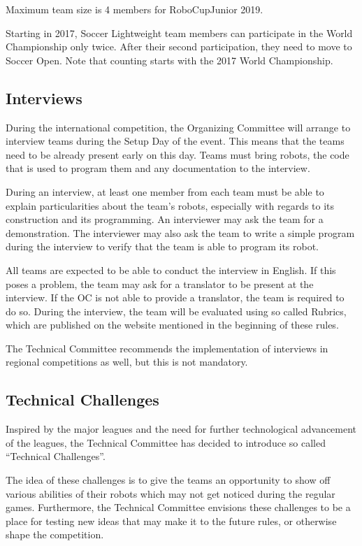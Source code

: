 \documentclass{article}
\begin{document}
Maximum team size is 4 members for RoboCupJunior 2019.

Starting in 2017, Soccer Lightweight team members can participate in the World
Championship only twice. After their second participation, they need to move to
Soccer Open. Note that counting starts with the 2017 World Championship.

\subsection{Interviews \label{ref-060}}

During the international competition, the Organizing Committee will arrange to
interview teams during the Setup Day of the event. This means that the teams
need to be already present early on this day. Teams must bring robots, the code
that is used to program them and any documentation to the interview.

During an interview, at least one member from each team must be able to explain
particularities about the team's robots, especially with regards to its
construction and its programming. An interviewer may ask the team for a
demonstration. The interviewer may also ask the team to write a simple program
during the interview to verify that the team is able to program its robot.

All teams are expected to be able to conduct the interview in English. If this
poses a problem, the team may ask for a translator to be present at the
interview. If the OC is not able to provide a translator, the team is required
to do so. During the interview, the team will be evaluated using so called
Rubrics, which are published on the website mentioned in the beginning of these
rules.

The Technical Committee recommends the implementation of interviews in regional
competitions as well, but this is not mandatory.

\subsection{Technical Challenges}

Inspired by the major leagues and the need for further technological
advancement of the leagues, the Technical Committee has decided to introduce so
called ``Technical Challenges''.

The idea of these challenges is to give the teams an opportunity to show off
various abilities of their robots which may not get noticed during the regular
games. Furthermore, the Technical Committee envisions these challenges to be a
place for testing new ideas that may make it to the future rules, or otherwise
shape the competition.
\end{document}
